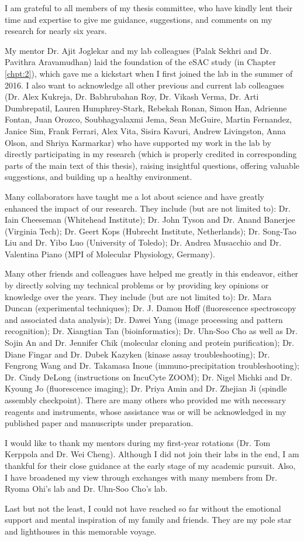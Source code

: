 I am grateful to all members of my thesis committee, who have kindly lent their time and expertise to give me guidance, suggestions, and comments on my research for nearly six years.

My mentor Dr. Ajit Joglekar and my lab colleagues (Palak Sekhri and Dr. Pavithra Aravamudhan) laid the foundation of the eSAC study (in Chapter \ref{chpt:2}), which gave me a kickstart when I first joined the lab in the summer of 2016. I also want to acknowledge all other previous and current lab colleagues (Dr. Alex Kukreja, Dr. Babhrubahan Roy, Dr. Vikash Verma, Dr. Arti Dumbrepatil, Lauren Humphrey-Stark, Rebekah Ronan, Simon Han,  Adrienne Fontan, Juan Orozco, Soubhagyalaxmi Jema, Sean McGuire, Martin Fernandez, Janice Sim, Frank Ferrari, Alex Vita, Sisira Kavuri, Andrew Livingston, Anna Olson, and Shriya Karmarkar) who have supported my work in the lab by directly participating in my research (which is properly credited in corresponding parts of the main text of this thesis), raising insightful questions, offering valuable suggestions, and building up a healthy environment.

Many collaborators have taught me a lot about science and have greatly enhanced the impact of our research. They include (but are not limited to): Dr. Iain Cheeseman (Whitehead Institute); Dr. John Tyson and Dr. Anand Banerjee (Virginia Tech); Dr. Geert Kops (Hubrecht Institute, Netherlands); Dr. Song-Tao Liu and Dr. Yibo Luo (University of Toledo); Dr. Andrea Musacchio and Dr. Valentina Piano (MPI of Molecular Physiology, Germany).

Many other friends and colleagues have helped me greatly in this endeavor, either by directly solving my technical problems or by providing key opinions or knowledge over the years. They include (but are not limited to): Dr. Mara Duncan (experimental techniques); Dr. J. Damon Hoff (fluorescence spectroscopy and associated data analysis); Dr. Dawei Yang (image processing and pattern recognition); Dr. Xiangtian Tan (bioinformatics); Dr. Uhn-Soo Cho as well as Dr. Sojin An and Dr. Jennifer Chik (molecular cloning and protein purification); Dr. Diane Fingar and Dr. Dubek Kazyken (kinase assay troubleshooting); Dr. Fengrong Wang and Dr. Takamasa Inoue (immuno-precipitation troubleshooting); Dr. Cindy DeLong (instructions on IncuCyte ZOOM); Dr. Nigel Michki and Dr. Kyoung Jo (fluorescence imaging); Dr. Priya Amin and Dr. Zhejian Ji (spindle assembly checkpoint). There are many others who provided me with necessary reagents and instruments, whose assistance was or will be acknowledged in my published paper \cite{eSAC} and manuscripts under preparation.

I would like to thank my mentors during my first-year rotations (Dr. Tom Kerppola and Dr. Wei Cheng). Although I did not join their labs in the end, I am thankful for their close guidance at the early stage of my academic pursuit. Also, I have broadened my view through exchanges with many members from Dr. Ryoma Ohi's lab and Dr. Uhn-Soo Cho's lab.

Last but not the least, I could not have reached so far without the emotional support and mental inspiration of my family and friends. They are my pole star and lighthouses in this memorable voyage.